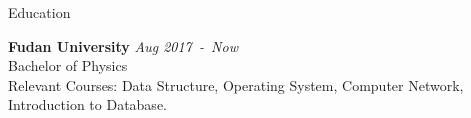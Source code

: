 \documentclass{resume} %
\begin{document}

\begin{rSection}{Education}

{\bf Fudan University} \hfill {\em Aug 2017\ -\ Now} 
\\ Bachelor of Physics
\\ Relevant Courses: Data Structure, Operating System, Computer Network, Introduction to Database.

\end{rSection}



\end{document}
